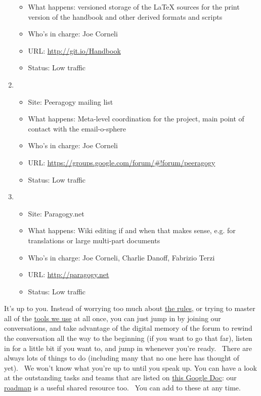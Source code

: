 \begin{enumerate}
\begin{itemize}
  \item
    What happens: versioned storage of the LaTeX sources for the print
    version of the handbook and other derived formats and scripts
  \item
    Who's in charge: Joe Corneli
  \item
    URL: \href{http://git.io/Handbook}{http://git.io/Handbook}
  \item
    Status: Low traffic
  \end{itemize}
\item
  \begin{itemize}
  \itemsep1pt\parskip0pt
  \item
    Site: Peeragogy mailing list
  \item
    What happens: Meta-level coordination for the project, main point of
    contact with the email-o-sphere
  \item
    Who's in charge: Joe Corneli
  \item
    URL:
    \href{https://groups.google.com/forum/\#!forum/peeragogy}{https://groups.google.com/forum/\#!forum/peeragogy}
  \item
    Status: Low traffic
  \end{itemize}
\item
  \begin{itemize}
  \itemsep1pt\parskip0pt
  \item
    Site: Paragogy.net
  \item
    What happens: Wiki editing if and when that makes sense, e.g. for
    translations or large multi-part documents
  \item
    Who's in charge: Joe Corneli, Charlie Danoff, Fabrizio Terzi
  \item
    URL: \href{http://paragogy.net}{http://paragogy.net}
  \item
    Status: Low traffic
  \end{itemize}
\end{enumerate}

It's up to you. Instead of worrying too much about
\href{http://peeragogy.org/co-working/}{the rules}, or trying to master
all of the \href{http://peeragogy.org/resources/technologies/}{tools we
use} at all once, you can just jump in by joining our conversations, and
take advantage of the digital memory of the forum to rewind the
conversation all the way to the beginning (if you want to go that far),
listen in for a little bit if you want to, and jump in whenever you're
ready.~ There are always lots of things to do (including many that no
one here has thought of yet).~ We won't know what you're up to until you
speak up. You can have a look at the outstanding tasks and teams that
are listed on
\href{https://docs.google.com/document/d/1_2I-z-Pt5NUKk-fpy4jsqxFeXbWS4ao4sIhkxCcRVeI/edit\#}{this
Google Doc}: our
\href{http://peeragogy.org/peeragogy-org-roadmap/}{roadmap} is a useful
shared resource too.~ You can add to these at any time.

